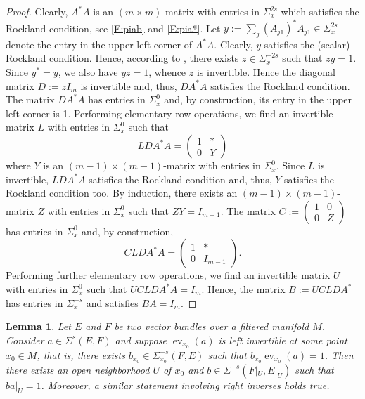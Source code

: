 \documentclass[reqno,12pt]{amsart}
\DeclareMathOperator{\ev}{ev}
\theoremstyle{plain}
\newtheorem{lemma}[theorem]{Lemma}
\theoremstyle{definition}
\begin{document}
\begin{proof}
Clearly, $A^*A$ is an $(m\times m)$-matrix with entries in $\Sigma^{2s}_x$ which satisfies the Rockland condition, see \eqref{E:piab} and \eqref{E:pia*}.
Let $y:=\sum_j(A_{j1})^*A_{j1}\in\Sigma^{2s}_x$ denote the entry in the upper left corner of $A^*A$.
Clearly, $y$ satisfies the (scalar) Rockland condition.
Hence, according to \cite[Theorem~6.2]{CGGP92}, there exists $z\in\Sigma^{-2s}_x$ such that $zy=1$.
Since $y^*=y$, we also have $yz=1$, whence $z$ is invertible.
Hence the diagonal matrix $D:=zI_m$ is invertible and, thus, $DA^*A$ satisfies the Rockland condition. 
The matrix $DA^*A$ has entries in $\Sigma^0_x$ and, by construction, its entry in the upper left corner is 1. 
Performing elementary row operations, we find an invertible matrix $L$ with entries in $\Sigma^0_x$ such that
$$
LDA^*A=\begin{pmatrix}1&*\\0&Y\end{pmatrix}
$$
where $Y$ is an $(m-1)\times(m-1)$-matrix with entries in $\Sigma^0_x$. 
Since $L$ is invertible, $LDA^*A$ satisfies the Rockland condition and, thus, $Y$ satisfies the Rockland condition too. 
By induction, there exists an $(m-1)\times(m-1)$-matrix $Z$ with entries in $\Sigma^0_x$ such that $ZY=I_{m-1}$. 
The matrix $C:=\begin{pmatrix}1&0\\0&Z\end{pmatrix}$ has entries in $\Sigma^0_x$ and, by construction, 
$$
CLDA^*A=\begin{pmatrix}1&*\\0&I_{m-1}\end{pmatrix}.
$$
Performing further elementary row operations, we find an invertible matrix $U$ with entries in $\Sigma^0_x$ such that $UCLDA^*A=I_m$. 
Hence, the matrix $B:=UCLDA^*$ has entries in $\Sigma^{-s}_x$ and satisfies $BA=I_m$.
\end{proof}


\begin{lemma}\label{L:pointwiseinv}
Let $E$ and $F$ be two vector bundles over a filtered manifold $M$.
Consider $a\in\Sigma^s(E,F)$ and suppose $\ev_{x_0}(a)$ is left invertible at some point $x_0\in M$, that is, there exists $b_{x_0}\in\Sigma_{x_0}^{-s}(F,E)$ such that $b_{x_0}\ev_{x_0}(a)=1$.
Then there exists an open neighborhood $U$ of $x_0$ and $b\in\Sigma^{-s}(F|_U,E|_U)$ such that $ba|_U=1$.
Moreover, a similar statement involving right inverses holds true.
\end{lemma}
\end{document}
